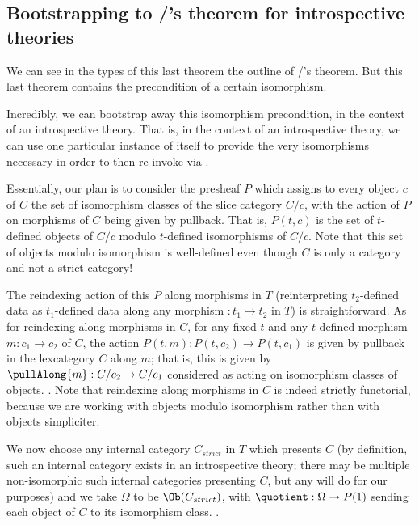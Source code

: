 \subsection{Bootstrapping to \Loeb/'s theorem for introspective theories}
We can see in the types of this last theorem the outline of \Loeb/'s theorem. But this last theorem contains the precondition of a certain isomorphism.

Incredibly, we can bootstrap away this isomorphism precondition, in the context of an introspective theory. That is, in the context of an introspective theory, we can use one particular instance of  itself to provide the very isomorphisms necessary in order to then re-invoke  via .

Essentially, our plan is to consider the presheaf $P$ which assigns to every object $c$ of $C$ the set of isomorphism classes of the slice category $C/c$, with the action of $P$ on morphisms of $C$ being given by pullback. That is, $P(t, c)$ is the set of $t$-defined objects of $C/c$ modulo $t$-defined isomorphisms of $C/c$. Note that this set of objects modulo isomorphism is well-defined even though $C$ is only a category and not a strict category!

The reindexing action of this $P$ along morphisms in $T$ (reinterpreting $t_2$-defined data as $t_1$-defined data along any morphism $: t_1 \to t_2$ in $T$) is straightforward. As for reindexing along morphisms in $C$, for any fixed $t$ and any $t$-defined morphism $m : c_1 \to c_2$ of $C$, the action $P(t, m) : P(t, c_2) \to P(t, c_1)$ is given by pullback in the lexcategory $C$ along $m$; that is, this is given by $\pullAlong{m} : C/c_2 \to C/c_1$ considered as acting on isomorphism classes of objects. . Note that reindexing along morphisms in $C$ is indeed strictly functorial, because we are working with objects modulo isomorphism rather than with objects simpliciter.

We now choose any internal category $C_{strict}$ in $T$ which presents $C$ (by definition, such an internal category exists in an introspective theory; there may be multiple non-isomorphic such internal categories presenting $C$, but any will do for our purposes) and we take $\Omega$ to be $\Ob(C_{strict})$, with $\quotient : \Omega \to P(1)$ sending each object of $C$ to its isomorphism class. . 

